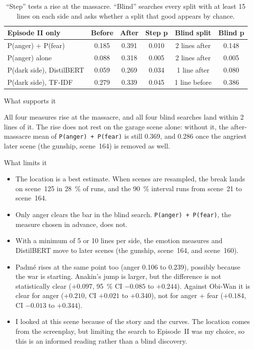 \documentclass[11pt,a4paper]{article}
\newcommand{\subheading}[1]{%
  \vspace{0.5em}%
  {\headingfont\fontsize{11}{13}\selectfont\color{inksec}#1}\\[0.1em]%
  \nopagebreak}
\begin{document}
\begin{table}[H]
\centering
\small
\begin{tabularx}{\linewidth}{Xccccc}
\toprule
\textbf{Episode II only} & \textbf{Before} & \textbf{After} & \textbf{Step p} & \textbf{Blind split} & \textbf{Blind p} \\
\midrule
P(anger) + P(fear) & 0.185 & 0.391 & 0.010 & 2 lines after & 0.148 \\
P(anger) alone & 0.088 & 0.318 & 0.005 & 2 lines after & 0.005 \\
P(dark side), DistilBERT & 0.059 & 0.269 & 0.034 & 1 line after & 0.080 \\
P(dark side), TF-IDF & 0.279 & 0.339 & 0.045 & 1 line before & 0.386 \\
\bottomrule
\end{tabularx}
\caption{``Step'' tests a rise at the massacre. ``Blind'' searches every split with at least 15
lines on each side and asks whether a split that good appears by chance.}
\end{table}

\subheading{What supports it}

All four measures rise at the massacre, and all four blind searches land within 2 lines of it.
The rise does not rest on the garage scene alone: without it, the after-massacre mean of
\texttt{P(anger) + P(fear)} is still 0.369, and 0.286 once the angriest later scene (the gunship,
scene~164) is removed as well.

\subheading{What limits it}

\begin{itemize}
\setlength\itemsep{0.15em}
\item The location is a best estimate. When scenes are resampled, the break lands on scene~125 in
      28~\% of runs, and the 90~\% interval runs from scene~21 to scene~164.
\item Only anger clears the bar in the blind search. \texttt{P(anger) + P(fear)}, the measure chosen
      in advance, does not.
\item With a minimum of 5 or 10 lines per side, the emotion measures and DistilBERT move to later
      scenes (the gunship, scene~164, and scene~160).
\item Padm\'e rises at the same point too (anger 0.106 to 0.239), possibly because the war is starting. Anakin's
      jump is larger, but the difference is not statistically clear ($+0.097$, 95~\% CI $-0.085$ to
      $+0.244$). Against Obi-Wan it is clear for anger ($+0.210$, CI $+0.021$ to $+0.340$), not for
      anger + fear ($+0.184$, CI $-0.013$ to $+0.344$).
\item I looked at this scene because of the story and the curves. The location comes from the
      screenplay, but limiting the search to Episode~II was my choice, so this is an informed reading
      rather than a blind discovery.
\end{itemize}
\end{document}
